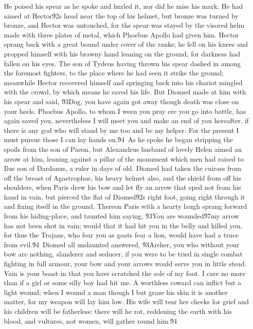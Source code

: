 {He poised his spear as he spoke and hurled it, nor did he miss his mark. He had aimed at Hector\'92s head near the top of his helmet, but bronze was turned by bronze, and Hector was untouched, for the spear was stayed by the visored helm made with three plates of metal, which Phoebus Apollo had given him. Hector sprang back with a great bound under cover of the ranks; he fell on his knees and propped himself with his brawny hand leaning on the ground, for darkness had fallen on his eyes. The son of Tydeus having thrown his spear dashed in among the foremost fighters, to the place where he had seen it strike the ground; meanwhile Hector recovered himself and springing back into his chariot mingled with the crowd, by which means he saved his life. But Diomed made at him with his spear and said, \'93Dog, you have again got away though death was close on your heels. Phoebus Apollo, to whom I ween you pray ere you go into battle, has again saved you, nevertheless I will meet you and make an end of you hereafter, if there is any god who will stand by me too and be my helper. For the present I must pursue those I can lay hands on.\'94\
As he spoke he began stripping the spoils from the son of Paeon, but Alexandrus husband of lovely Helen aimed an arrow at him, leaning against a pillar of the monument which men had raised to Ilus son of Dardanus, a ruler in days of old. Diomed had taken the cuirass from off the breast of Agastrophus, his heavy helmet also, and the shield from off his shoulders, when Paris drew his bow and let fly an arrow that sped not from his hand in vain, but pierced the flat of Diomed\'92s right foot, going right through it and fixing itself in the ground. Thereon Paris with a hearty laugh sprang forward from his hiding-place, and taunted him saying, \'93You are wounded\'97my arrow has not been shot in vain; would that it had hit you in the belly and killed you, for thus the Trojans, who fear you as goats fear a lion, would have had a truce from evil.\'94\
Diomed all undaunted answered, \'93Archer, you who without your bow are nothing, slanderer and seducer, if you were to be tried in single combat fighting in full armour, your bow and your arrows would serve you in little stead. Vain is your boast in that you have scratched the sole of my foot. I care no more than if a girl or some silly boy had hit me. A worthless coward can inflict but a light wound; when I wound a man though I but graze his skin it is another matter, for my weapon will lay him low. His wife will tear her cheeks for grief and his children will be fatherless: there will he rot, reddening the earth with his blood, and vultures, not women, will gather round him.\'94\
}
